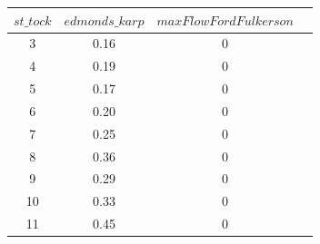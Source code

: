 \documentclass[a4paper]{article}
\begin{document}
\begin{center}
\begin{tabular}{ |c|c|c|c| } 
\hline
$st\_tock$ & $edmonds\_karp$ & $maxFlowFordFulkerson$ \\
\hline
3 & 0.16 & 0 \\ 
4 & 0.19 & 0 \\ 
5 & 0.17 & 0 \\ 
6 & 0.20 & 0 \\ 
7 & 0.25 & 0 \\ 
8 & 0.36 & 0 \\ 
9 & 0.29 & 0 \\ 
10 & 0.33 & 0 \\ 
11 & 0.45 & 0 \\ 
\hline
\end{tabular}
\end{center}
\end{document}
